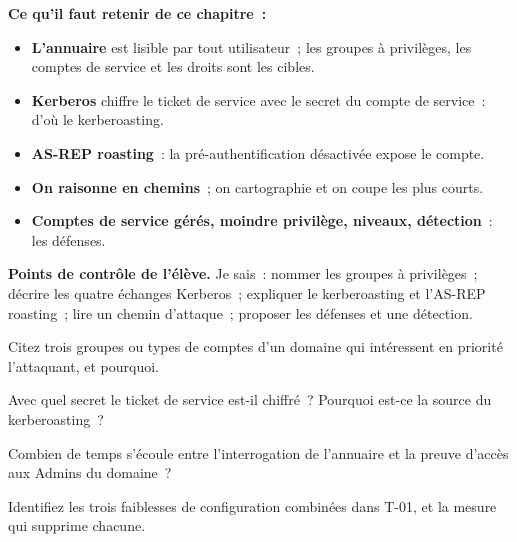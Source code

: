 \begin{boxresume}
\textbf{Ce qu'il faut retenir de ce chapitre~:}
\begin{itemize}
    \item \textbf{L'annuaire} est lisible par tout utilisateur~; les
          groupes à privilèges, les comptes de service et les droits sont
          les cibles.
    \item \textbf{Kerberos} chiffre le ticket de service avec le secret du
          compte de service~: d'où le kerberoasting.
    \item \textbf{AS-REP roasting}~: la pré-authentification désactivée
          expose le compte.
    \item \textbf{On raisonne en chemins}~; on cartographie et on coupe les
          plus courts.
    \item \textbf{Comptes de service gérés, moindre privilège, niveaux,
          détection}~: les défenses.
\end{itemize}
\end{boxresume}

\begin{boxinfo}
\textbf{Points de contrôle de l'élève.} Je sais~: nommer les groupes à
privilèges~; décrire les quatre échanges Kerberos~; expliquer le
kerberoasting et l'AS-REP roasting~; lire un chemin d'attaque~; proposer
les défenses et une détection.
\end{boxinfo}

\bigskip

\begin{boxexo}[title={\ding{45}\quad Exercice~10.1. Les groupes \niveaubase}]
Citez trois groupes ou types de comptes d'un domaine qui intéressent en
priorité l'attaquant, et pourquoi.
\end{boxexo}

\begin{boxexo}[title={\ding{45}\quad Exercice~10.2. Le secret \niveaubase}]
Avec quel secret le ticket de service est-il chiffré~? Pourquoi est-ce la
source du kerberoasting~?
\end{boxexo}

\begin{boxexo}[title={\ding{45}\quad Exercice~10.3. Chronologie \niveaubase}]
Combien de temps s'écoule entre l'interrogation de l'annuaire et la preuve
d'accès aux Admins du domaine~?
\end{boxexo}

\begin{boxexo}[title={\ding{45}\quad Exercice~10.4. Les trois faiblesses \niveaumoyen}]
Identifiez les trois faiblesses de configuration combinées dans T-01, et la
mesure qui supprime chacune.
\end{boxexo}

